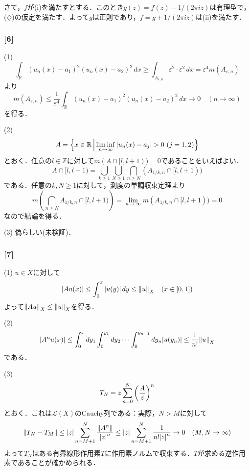 \documentclass[a4j]{ltjsarticle}
\newcommand{\Rset}{\mathbb{R}}
\newcommand{\Zset}{\mathbb{Z}}
\newcommand{\1}{\mathbbm{1}}
\numberwithin{equation}{section}
\theoremstyle{definition}
\begin{document}
さて，$f$が(i)を満たすとする．このとき$g(z)=f(z)-1/(2\pi iz)$は有理型で，($\diamondsuit$)の仮定を満たす．よって$g$は正則であり，$f=g+1/(2\pi iz)$は(ii)を満たす．

\subsubsection*{[6]}
(1) 
\begin{equation}
    \int_{\Rset}(u_n(x)-a_1)^2(u_n(x)-a_2)^2\,dx\geq \int_{A_{\varepsilon,n}}\varepsilon^2\cdot \varepsilon^2\,dx=\varepsilon^4m(A_{\varepsilon,n})
\end{equation}
より
\begin{equation}
    m(A_{\varepsilon,n})\leq \frac{1}{\varepsilon^4}\int_{\Rset}(u_n(x)-a_1)^2(u_n(x)-a_2)^2\,dx\to0\quad (n\to\infty)
\end{equation}
を得る．

(2) 
\begin{equation}
    A=\qty{x\in \Rset\,\middle|\, \liminf_{n\to\infty}\abs{u_n(x)-a_j}>0\ (j=1,2)}
\end{equation}
とおく．任意の$l\in\Zset$に対して$m(A\cap [l,l+1))=0$であることをいえばよい．
\begin{equation}
    A\cap[l,l+1)=\bigcup_{k\geq 1}\bigcup_{N\geq 1}\bigcap_{n\geq N}(A_{1/k,n}\cap [l,l+1))
\end{equation}
である．任意の$k,N\geq 1$に対して，測度の単調収束定理より
\begin{equation}
    m\left(\bigcap_{n\geq N}A_{1/k,n}\cap[l,l+1) \right)=\lim_{n\to\infty}m(A_{1/k,n}\cap[l,l+1))=0 
\end{equation}
なので結論を得る．

(3) 偽らしい(未検証)．

\subsubsection*{[7]}
(1) $u\in X$に対して
\begin{equation}
    |Au(x)|\leq \int_{0}^{x}\abs{u(y)}\,dy\leq \norm{u}_{X}\quad (x\in [0,1])
\end{equation}
よって$\norm{Au}_{X}\leq \norm{u}_{X}$を得る．

(2) 
\begin{equation}
    \abs{A^nu(x)}\leq \int_{0}^{x}dy_1\int_{0}^{y_1}dy_2\cdots\int_{0}^{y_{n-1}}dy_{n}\abs{u(y_{n})}\leq \frac{1}{n!}\norm{u}_{X}
\end{equation}
である．

(3) 
\begin{equation}
    T_N=z\sum_{n=0}^N\qty(\frac{A}{z})^n 
\end{equation}
とおく．これは$\mathcal{L}(X)$のCauchy列である：実際，$N>M$に対して
\begin{equation}
    \norm{T_N-T_{M}}\leq \abs{z}\sum_{n=M+1}^N\frac{\norm{A^n}}{\abs{z}^n}\leq \abs{z}\sum_{n=M+1}^{N}\frac{1}{n!\abs{z}^n}\to0\quad (M,N\to\infty)
\end{equation}
よって$T_N$はある有界線形作用素$T$に作用素ノルムで収束する．$T$が求める逆作用素であることが確かめられる．
\end{document}
